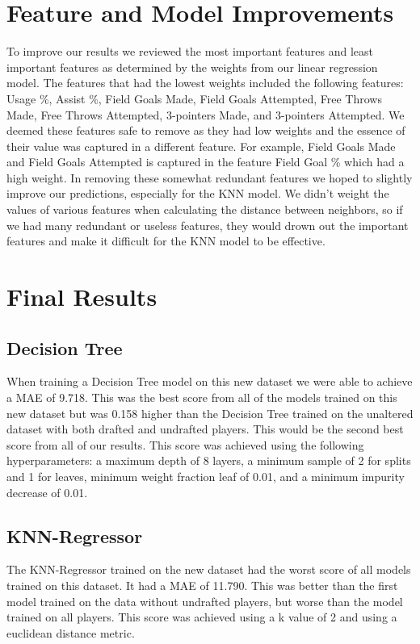 \documentclass{article}
\begin{document}
\section{Feature and Model Improvements}

To improve our results we reviewed the most important features and least
important features as determined by the weights from our linear regression
model. The features that had the lowest weights included the following features:
Usage \%, Assist \%, Field Goals Made, Field Goals Attempted, Free Throws Made,
Free Throws Attempted, 3-pointers Made, and 3-pointers Attempted. We deemed
these features safe to remove as they had low weights and the essence of their
value was captured in a different feature. For example, Field Goals Made and
Field Goals Attempted is captured in the feature Field Goal \% which had a high
weight. In removing these somewhat redundant features we hoped to slightly
improve our predictions, especially for the KNN model. We didn't weight the
values of various features when calculating the distance between neighbors, so
if we had many redundant or useless features, they would drown out the important
features and make it difficult for the KNN model to be effective.

\section{Final Results}

\subsection{Decision Tree}

When training a Decision Tree model on this new dataset we were able to achieve
a MAE of 9.718. This was the best score from all of the models trained on this
new dataset but was 0.158 higher than the Decision Tree trained on the unaltered
dataset with both drafted and undrafted players. This would be the second best
score from all of our results. This score was achieved using the following
hyperparameters: a maximum depth of 8 layers, a minimum sample of 2 for splits
and 1 for leaves, minimum weight fraction leaf of 0.01, and a minimum impurity
decrease of 0.01.

\subsection{KNN-Regressor}

The KNN-Regressor trained on the new dataset had the worst score of all models
trained on this dataset. It had a MAE of 11.790. This was better than the first
model trained on the data without undrafted players, but worse than the model
trained on all players. This score was achieved using a k value of 2 and using a
euclidean distance metric.
\end{document}
